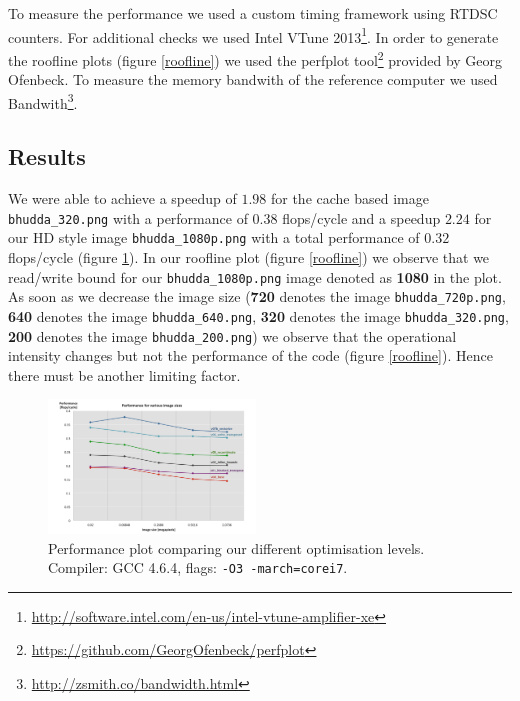 To measure the performance we used a custom timing framework using RTDSC counters. For additional checks we used Intel VTune 2013\footnote{\url{http://software.intel.com/en-us/intel-vtune-amplifier-xe}}. In order to generate the roofline plots (figure \ref{roofline}) we used the perfplot tool\footnote{\url{https://github.com/GeorgOfenbeck/perfplot}} provided by Georg Ofenbeck. To measure the memory bandwith of the reference computer we used Bandwith\footnote{\url{http://zsmith.co/bandwidth.html}}.
\subsection{Results}
We were able to achieve a speedup of $1.98$ for the cache based image \texttt{bhudda\_320.png} with a performance of $0.38$ flops/cycle and a speedup $2.24$ for our HD style image \texttt{bhudda\_1080p.png} with a total performance of $0.32$ flops/cycle (figure \ref{performance}). In our roofline plot \cite{Williams:2009:RIV:1498765.1498785} (figure \ref{roofline}) we observe that we read/write bound for our \texttt{bhudda\_1080p.png} image denoted as \textbf{1080} in the plot. As soon as we decrease the image size (\textbf{720} denotes the image \texttt{bhudda\_720p.png}, \textbf{640} denotes the image \texttt{bhudda\_640.png}, \textbf{320} denotes the image \texttt{bhudda\_320.png}, \textbf{200} denotes the image \texttt{bhudda\_200.png}) we observe that the operational intensity changes but not the performance of the code (figure \ref{roofline}). Hence there must be another limiting factor. 

\setlength\fboxsep{0pt}
\setlength\fboxrule{0.5pt}
 
\begin{figure}\vspace{-5mm}
  \includegraphics[trim=10mm 0mm 10mm 0mm, clip, width=0.49\textwidth]{figures/performance}
  \caption{Performance plot comparing our different optimisation levels. Compiler: GCC 4.6.4, flags: \lstinline{-O3 -march=corei7}.\label{performance}}
\end{figure}
 
